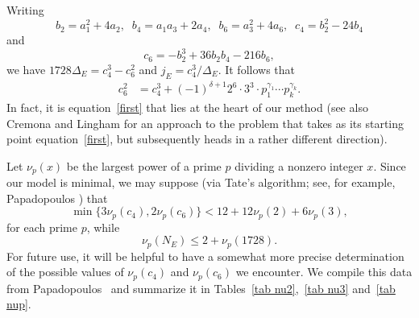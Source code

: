 Writing
$$
b_2 = a_1^2+4a_2, \; \; b_4 = a_1 a_3 + 2 a_4, \; \; 
b_6 = a_3^2+4a_6, \; \; 
c_4 = b_2^2-24 b_4 
$$
and
$$
c_6 = -b_2^3+ 36 b_2 b_4 -216 b_6,
$$
we have
$1728 \Delta_E = c_4^3-c_6^2$ and
$j_E = c_4^3/\Delta_E$.
It follows that
\begin{align} \label{first}
c_6^2 &= c_4^3 + (-1)^{\delta +1} 2^6 \cdot 3^3 \cdot p_1^{\gamma_1} \cdots p_k^{\gamma_k}.
\end{align}
In fact, it is equation~\eqref{first} that lies at the heart of our method (see also Cremona and 
Lingham \cite{CrLi} for an approach to the problem that takes as its starting point equation~\eqref{first}, but 
subsequently heads in a rather different direction).

Let $\nu_p(x)$ be the largest power of a prime $p$ dividing a nonzero integer $x$. Since our model is minimal, we 
may suppose  (via Tate's algorithm; see, for example, Papadopoulos \cite{Pap}) that 
$$
\min \{ 3 \nu_p (c_4), 2 \nu_p (c_6) \} < 12 + 12 \nu_p(2) + 6 \nu_p(3),
$$
for each prime $p$, while
$$
\nu_p (N_E) \leq 2 + \nu_p (1728).
$$ 
For future use, it will be helpful to have a somewhat more precise determination of the possible 
values of $\nu_p(c_4)$ and $\nu_p(c_6)$ we encounter. We compile this data from Papadopoulos~\cite{Pap} and
summarize it in Tables~\ref{tab nu2},~\ref{tab nu3} and~\ref{tab nup}.

